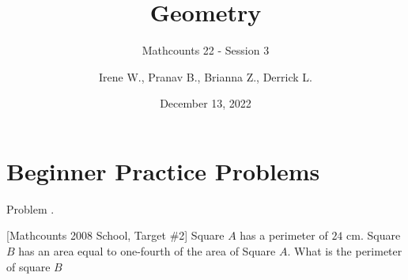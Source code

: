 \documentclass[9pt]{beamer}
\title{Geometry}
\subtitle{Mathcounts 22 - Session 3}
\author{Irene W., Pranav B., Brianna Z., Derrick L.}
\institute{BISV Mathcounts Club 22}
\date{December 13, 2022}
\newcounter{problem}[section]
\begin{document}
\begin{frame}
    \titlepage        
\end{frame}

\setcounter{section}{7}

\section{Beginner Practice Problems}
\begin{frame}[t, fragile]{Problem \thesection.\theproblem}
    \begin{block}{} [Mathcounts 2008 School, Target \#2]
Square $A$ has a perimeter of $24$ cm. Square $B$ has an area equal to one-fourth of the area of Square $A$. What is the perimeter of square $B$
        

    \end{block}
\end{frame}
\end{document}
